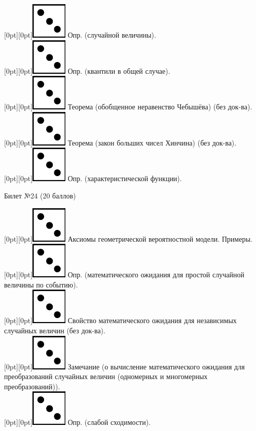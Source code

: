 \documentclass[preview]{standalone}
\begin{document}
\raisebox{-1pt}[0pt][0pt]{\includegraphics[width=0.02\linewidth]{3.png}} Опр. (случайной величины). \\ 
\raisebox{-1pt}[0pt][0pt]{\includegraphics[width=0.02\linewidth]{3.png}}   Опр. (квантили в общей случае). \\
\raisebox{-1pt}[0pt][0pt]{\includegraphics[width=0.02\linewidth]{3.png}} Теорема (обобщенное неравенство Чебышёва) (без док-ва). \\
\raisebox{-1pt}[0pt][0pt]{\includegraphics[width=0.02\linewidth]{3.png}} Теорема (закон больших чисел Хинчина) (без док-ва). \\
\raisebox{-1pt}[0pt][0pt]{\includegraphics[width=0.02\linewidth]{3.png}} Опр. (характеристической функции). \\
\begin{center} {\Large Билет №24 (20 баллов)} \end{center}
\raisebox{-1pt}[0pt][0pt]{\includegraphics[width=0.02\linewidth]{3.png}} Аксиомы геометрической вероятностной модели. Примеры. \\
\raisebox{-1pt}[0pt][0pt]{\includegraphics[width=0.02\linewidth]{3.png}} Опр. (математического ожидания для простой случайной величины по событию). \\
\raisebox{-1pt}[0pt][0pt]{\includegraphics[width=0.02\linewidth]{3.png}} Свойство  математического ожидания для независимых случайных величин (без док-ва). \\
\raisebox{-1pt}[0pt][0pt]{\includegraphics[width=0.02\linewidth]{3.png}} Замечание (о вычисление  математического ожидания для преобразований случайных величин (одномерных и многомерных преобразований)). \\
\raisebox{-1pt}[0pt][0pt]{\includegraphics[width=0.02\linewidth]{3.png}} Опр. (слабой сходимости). \\
\end{document}
